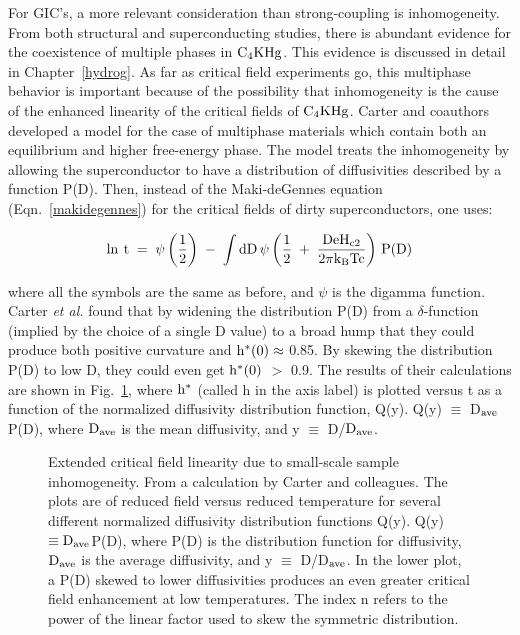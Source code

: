         For  GIC's, a more relevant  consideration  than strong-coupling is
inhomogeneity.     From     both  structural\cite{kamitakahara84,K167}  and
superconducting\cite{Z234,delong83} studies, there is abundant  evidence for
the coexistence of  multiple phases   in $\rm  C_4KHg$.  This  evidence  is
discussed  in detail in Chapter~\ref{hydrog}.    As far  as  critical field
experiments  go, this  multiphase behavior  is important  because  of   the
possibility  that inhomogeneity is the  cause of the  enhanced linearity of
the critical  fields of $\rm C_4KHg$.  Carter  and coauthors\cite{carter81}
developed a model for  the case of multiphase materials  which contain both
an  equilibrium  and   higher  free-energy phase.    The model  treats  the
inhomogeneity by allowing  the   superconductor  to have a distribution  of
diffusivities described by a function P(D).  Then, instead of the
Maki-deGennes equation (Eqn.~\ref{makidegennes}) for the critical fields of
dirty superconductors, one uses:

\begin{equation}
\label{carter}
\rm \ln \: t \; = \; \psi\left(\frac{1}{2}\right) \; - \; \int dD \, \psi\left(
\frac{1}{2} \; + \; \frac{D e H_{c2}}{2 \pi k_B T c}  \right) \, P(D) 
\end{equation}

\noindent where all the symbols are the same as before, and $\psi$ is the
digamma function.  Carter  {\em et  al.\/}  found    that by widening   the
distribution P(D) from  a $\delta$-function  (implied by the   choice of  a
single D value)   to a broad  hump that  they could produce  both  positive
curvature and $\rm h^*(0) \approx$ 0.85.  By skewing  the distribution P(D)
to  low D, they  could even get  $\rm  h^*(0)$  $>$ 0.9.\cite{carter81} The
results of their calculations are   shown in Fig.~\ref{inhomo}, where  $\rm
h^*$ (called h in the axis label) is plotted versus  t as a function of the
normalized diffusivity  distribution function,  Q(y).  Q(y) $\equiv$  D$\rm
_{ave}$  P(D), where $\rm D_{ave}$ is  the mean diffusivity, and y $\equiv$
D/$\rm D_{ave}$.

\begin{figure}
\vspace{7.5in}
\caption[Extended critical field linearity due to  small-scale sample
homogeneity (calculated).]{Extended critical   field   linearity  due    to
small-scale  sample  inhomogeneity.  From  a   calculation  by Carter   and
colleagues.\cite{carter81} The plots are  of reduced  field  versus reduced
temperature  for   several  different  normalized diffusivity  distribution
functions  Q(y).    Q(y)  $\equiv \rm  D_{ave}$P(D),  where   P(D)   is the
distribution function  for   diffusivity,  $\rm D_{ave}$   is  the   average
diffusivity, and y  $\equiv$ D/D$\rm _{ave}$.   In  the lower plot,  a P(D)
skewed  to lower  diffusivities  produces  an even greater  critical  field
enhancement at low temperatures.  The index n refers to the power of the
linear factor used to skew the symmetric distribution.}
\label{inhomo}
\end{figure}

